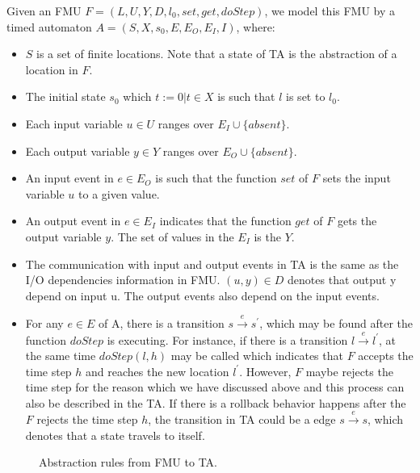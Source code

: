Given an FMU $F=(L,U,Y,D,l_{0},set,get,doStep)$, we model this FMU by a timed automaton $A = (S,X,s_{0},E,E_{O},E_{I},I)$, where:
\begin{itemize}
\item
$S$ is a set of finite locations. Note that a state of TA is the abstraction of a location in $F$.
\item
The initial state $s_{0}$ which $t:=0 \vert t \in X$ is such that $l$ is set to $l_{0}$. 
\item
Each input variable $u \in U$ ranges over $E_{I} \cup \{absent\}$.
\item
Each output variable $y \in Y$ ranges over $E_{O} \cup \{absent\}$.
\item
An input event in $e \in E_{O}$ is such that the function $set$ of $F$ sets the input variable $u$ to a given value. 
\item
An output event in $e \in E_{I}$ indicates that the function $get$ of $F$ gets the output variable $y$. The set of values in the $E_{I}$ is the $Y$.  
\item
The communication with input and output events in TA is the same as the I/O dependencies information in FMU. $(u,y) \in D$ denotes that output y depend on input u. The output events also depend on the input events.
\item
For any $e \in E$ of A, there is a transition $s \xrightarrow{e} s^{\prime}$, which may be found after the function $doStep$ is executing. For instance, if there is a transition $l \xrightarrow{e} l^{\prime}$, at the same time $doStep(l,h)$ may be called which indicates that $F$ accepts the time step $h$ and reaches the new location $l^{\prime}$. However, $F$ maybe rejects the time step for the reason which we have discussed above and this process can also be described in the TA. If there is a rollback behavior happens after the $F$ rejects the time step $h$, the transition in TA could be a edge $s \xrightarrow{e} s$, which denotes that a state travels to itself.

\end{itemize}
\begin{figure}[htbp]
	\caption{Abstraction rules from FMU to TA.}
	\label{fmutota}
\end{figure}
